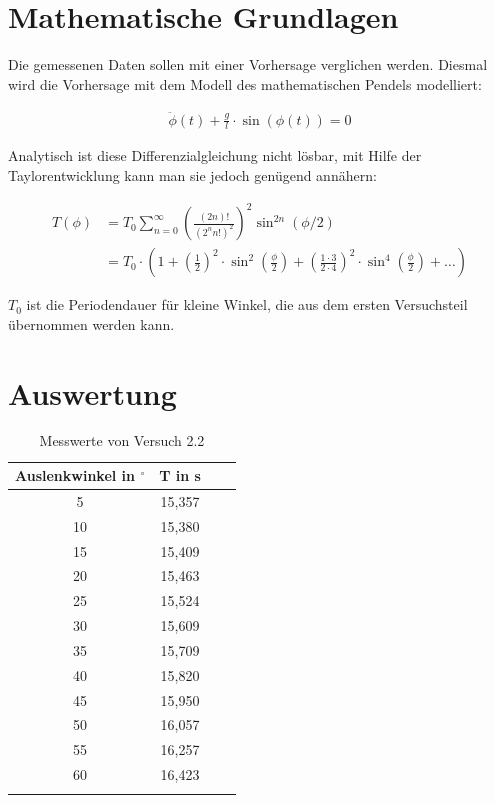 \section{Mathematische Grundlagen}

Die gemessenen Daten sollen mit einer Vorhersage verglichen werden.
Diesmal wird die Vorhersage mit dem Modell des mathematischen Pendels modelliert:

\begin{align}
	\ddot{\phi}(t) + \frac{g}{l} \cdot \sin ( \phi (t)) = 0
\end{align}

Analytisch ist diese Differenzialgleichung nicht lösbar, mit Hilfe der Taylorentwicklung kann man sie jedoch genügend annähern:

\begin{align}
	T(\phi) & = T_0 \sum_{n=0}^{\infty} \left( \frac{\left(2n\right)!}{\left(2^{n}n!\right)^2} \right)^2 \sin^{2n} \left(\phi /2\right) \\
& = T_0\cdot\left(1+\left(\frac{1}{2}\right)^2 \cdot \sin^2\left(\frac{\phi}{2}\right)+\left(\frac{1\cdot 3}{2\cdot 4}\right)^2 \cdot \sin^4\left(\frac{\phi}{2}\right) + \dots\right)
\end{align}

$T_0$ ist die Periodendauer für kleine Winkel, die aus dem ersten Versuchsteil übernommen werden kann.

\section{Auswertung}

\begin{table}[h!]
    \begin{center}
        \caption{Messwerte von Versuch 2.2}
        \begin{tabular}{cccc}
            \hline
            Auslenkwinkel in $ ^{\circ}$ & T in s \\
            \hline
            5                  & 15,357 \\
            10                & 15,380 \\
            15                & 15,409 \\
            20                & 15,463 \\
            25                & 15,524 \\
            30                & 15,609 \\
            35                & 15,709 \\
            40                & 15,820 \\
            45                & 15,950 \\
            50                & 16,057 \\
            55                & 16,257 \\
            60                & 16,423 \\
            \hline
            \label{tab:2_2-werte}
        \end{tabular}
    \end{center}
\end{table}


